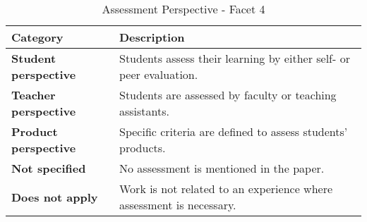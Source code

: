 \begin{table}
	\centering
	\caption {Assessment Perspective - Facet 4}
		{\begin{tabular}{p{1.2in}|p{3.6in}}
			\bf Category & \bf Description \\
			\hline
			\bf Student perspective & Students assess their learning by either self- or peer evaluation. \\
			\bf Teacher perspective & Students are assessed by faculty or teaching assistants.  \\
			\bf Product perspective & Specific criteria are defined to assess students' products. \\
			\bf Not specified & No assessment is mentioned in the paper. \\
			\bf Does not apply & Work is not related to an experience where assessment is necessary. \\
		\end{tabular}}
	\label{tab:assessmentPerspective}
\end{table}

